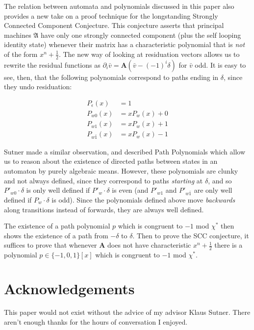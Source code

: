 \documentclass[runningheads]{llncs}
\renewcommand{\P}{\mathfrak{A}}
\newcommand{\2}{\textbf{2}}
\newcommand{\Am}{\textbf{A}}
\newcommand{\del}{\partial}
\newcommand{\vv}{\bar{v}}
\begin{document}
The relation between automata and polynomials discussed in this paper 
also provides a new take on a proof technique for the longstanding
Strongly Connected Component Conjecture. This conjecture 
asserts that principal machines $\P$ have only one strongly connected component 
(plus the self looping identity state) whenever their matrix has a 
characteristic polynomial that is \emph{not} of the form $x^n + \frac{1}{2}$.
The new way of looking at residuation vectors allows us to rewrite the 
residual functions as $\del_i \vv = \Am (\vv - (-1)^i \delta)$ for $\vv$ odd.
It is easy to see, then, that the following polynomials correspond to paths
ending in $\delta$, since they undo residuation:

\begin{align*}
  P_\epsilon(x)   &= 1\\
  P_{w0}(x)       &= xP_w(x) + 0\\
  P_{w1}(x)       &= xP_w(x) + 1\\
  P_{w\bar{1}}(x) &= xP_w(x) - 1
\end{align*}

Sutner made a similar observation, and described Path Polynomials 
\cite{Sutner18:abelian_automata} which
allow us to reason about the existence of directed paths between states 
in an automaton by purely algebraic means. However, these polynomials are
clunky and not always defined, since they correspond to paths
\emph{starting} at $\delta$, and so $P'_{w0} \cdot \delta$ is only well 
defined if $P'_w \cdot \delta$ is even (and $P'_{w1}$ and $P'_{w\bar{1}}$ 
are only well defined if $P_w \cdot \delta$ is odd). Since the polynomials 
defined above move \emph{backwards} along transitions instead of forwards, 
they are always well defined.

The existence of a path polynomial $p$ which is congruent to $-1$ mod $\chi^*$
then shows the existence of a path from $-\delta$ to $\delta$.
Then to prove the SCC conjecture, it suffices to prove that whenever $\Am$ 
does not have characteristic $x^n + \frac{1}{2}$ there is a polynomial 
$p \in \{-1,0,1\}[x]$ which is congruent to $-1$ mod $\chi^*$. 

\section*{Acknowledgements}
This paper would not exist without the advice of my advisor Klaus Sutner.
There aren't enough thanks for the hours of conversation I enjoyed.

\newpage



\end{document}
